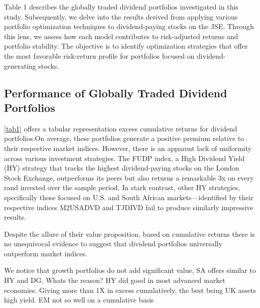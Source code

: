 \documentclass[11pt,preprint, authoryear]{elsarticle}
\numberwithin{equation}{section}
\numberwithin{figure}{section}
\numberwithin{table}{section}
\begin{document}
Table 1 describes the globally traded dividend portfolios investigated
in this study. Subsequently, we delve into the results derived from
applying various portfolio optimization techniques to dividend-paying
stocks on the JSE. Through this lens, we assess how each model
contributes to risk-adjusted returns and portfolio stability. The
objective is to identify optimization strategies that offer the most
favorable risk-return profile for portfolios focused on
dividend-generating stocks.

\hypertarget{performance-of-globally-traded-dividend-portfolios}{%
\subsection*{Performance of Globally Traded Dividend
Portfolios}\label{performance-of-globally-traded-dividend-portfolios}}

\ref{tab1} offers a tabular representation excess cumulative returns for
dividend portfolios.On average, these portfolios generate a positive
premium relative to their respective market indices. However, there is
an apparent lack of uniformity across various investment strategies. The
FUDP index, a High Dividend Yield (HY) strategy that tracks the highest
dividend-paying stocks on the London Stock Exchange, outperforms its
peers but also returns a remarkable 3x on every rand invested over the
sample period. In stark contrast, other HY strategies, specifically
those focused on U.S. and South African markets---identified by their
respective indices M2USADVD and TJDIVD fail to produce similarly
impressive results.

Despite the allure of their value proposition, based on cumulative
returns there is no unequivocal evidence to suggest that dividend
portfolios universally outperform market indices.

We notice that growth portfolios do not add significant value, SA offers
similar to HY and DG. Whats the reason? HY did good in most advanced
market economies. Giving more than 1X in excess cumulatively, the best
being UK assets high yield. EM not so well on a cumulative basis
\end{document}
